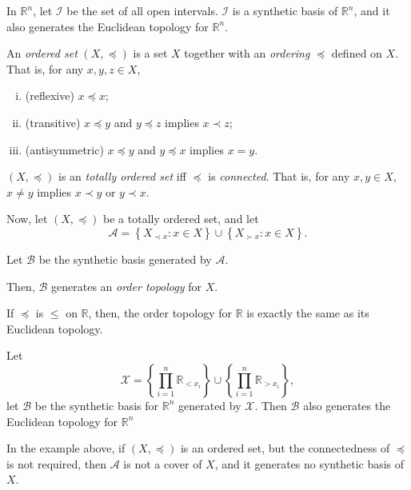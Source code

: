 \documentclass{report}
\begin{document}
\begin{example}
	In $\mathbb R^n$, let $\mathcal I$ be the set of all open intervals. $\mathcal I$ is a synthetic basis of $\mathbb R^n$, and it also generates the Euclidean topology for $\mathbb R^n$.
\end{example}


\begin{example}
	An \textit{ordered set} $(X, \preceq)$ is a set $X$ together with an \textit{ordering} $\preceq$ defined on $X$. That is, for any $x, y, z \in X$,
	\begin{enumerate}[(i)]
		\item
		(reflexive) $x \preceq x$;
		
		\item
		(transitive) $x \preceq y$ and $y \preceq z$ implies $x \prec z$;
		
		\item
		(antisymmetric) $x \preceq y$ and $y \preceq x$ implies $x = y$.
	\end{enumerate}
	
	$(X, \preceq)$ is an \textit{totally ordered set} iff $\preceq$ is \textit{connected}. That is, for any $x,y \in X$, $x \ne y$ implies $x\prec y$ or $y \prec x$.
	
	Now, let $(X, \preceq)$ be a totally ordered set, and let
	$$
	\mathcal A = \left\{X_{\prec x} : x \in X \right\} \cup \left\{ X_{\succ x} : x \in X \right\}.
	$$
	
	Let $\mathcal B$ be the synthetic basis generated by $\mathcal A$.
	
	Then, $\mathcal B$ generates an \textit{order topology} for $X$.
	
	If $\preceq$ is $\le$ on $\mathbb R$, then, the order topology for $\mathbb R$ is exactly the same as its Euclidean topology.
	
	Let
	$$
	\mathcal X = \left\{ \prod_{i = 1}^n \mathbb R_{< x_i} \right\} \cup \left\{ \prod_{i = 1}^n \mathbb R_{> x_i} \right\},
	$$
	let $\mathcal B$ be the synthetic basis for $\mathbb R^n$ generated by $\mathcal X$. Then $\mathcal B$ also generates the Euclidean topology for $\mathbb R^n$
\end{example}


\begin{note}
	In the example above, if $(X, \preceq)$ is an ordered set, but the connectedness of $\preceq$ is not required, then $\mathcal A$ is not a cover of $X$, and it generates no synthetic basis of $X$.
\end{note}
\end{document}
